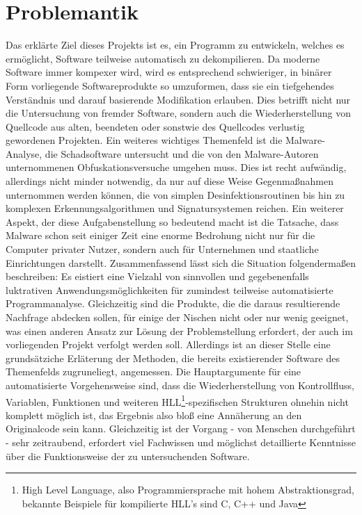 \documentclass[11pt]{article} %
\begin{document}
\section{Problemantik}
Das erklärte Ziel dieses Projekts ist es, ein Programm zu entwickeln, welches
es ermöglicht, Software teilweise automatisch zu dekompilieren. Da moderne Software immer kompexer
wird, wird es entsprechend schwieriger, in binärer Form vorliegende Softwareprodukte so umzuformen,
dass sie ein tiefgehendes Verständnis und darauf basierende Modifikation erlauben.
Dies betrifft nicht nur die Untersuchung von fremder Software, sondern auch die Wiederherstellung
von Quellcode aus alten, beendeten oder sonstwie des Quellcodes verlustig gewordenen Projekten.
Ein weiteres wichtiges Themenfeld ist die Malware-Analyse, die Schadsoftware untersucht und die von
den Malware-Autoren unternommenen Obfuskationsversuche umgehen muss. Dies ist recht aufwändig,
allerdings nicht minder notwendig, da nur auf diese Weise Gegenmaßnahmen unternommen werden können,
die von simplen Desinfektionsroutinen bis hin zu komplexen Erkennungsalgorithmen und Signatursystemen
reichen. Ein weiterer Aspekt, der diese Aufgabenstellung so bedeutend macht ist die Tatsache, dass
Malware schon seit einiger Zeit eine enorme Bedrohung nicht nur für die Computer privater Nutzer, sondern
auch für Unternehmen und staatliche Einrichtungen darstellt. Zusammenfassend lässt sich die Situation
folgendermaßen beschreiben: Es eistiert eine Vielzahl von sinnvollen und gegebenenfalls luktrativen
Anwendungsmöglichkeiten für zumindest teilweise automatisierte Programmanalyse. Gleichzeitig sind die
Produkte, die die daraus resultierende Nachfrage abdecken sollen, für einige der Nischen nicht oder nur
wenig geeignet, was einen anderen Ansatz zur Lösung der Problemstellung erfordert, der auch im vorliegenden
Projekt verfolgt werden soll. Allerdings ist an dieser Stelle eine grundsätziche Erläterung der Methoden,
die bereits existierender Software des Themenfelds zugruneliegt, angemessen.
Die Hauptargumente für eine automatisierte Vorgehensweise sind, dass die Wiederherstellung von Kontrollfluss,
Variablen, Funktionen und weiteren HLL\footnote{High Level Language, also Programmiersprache mit hohem
Abstraktionsgrad, bekannte Beispiele für kompilierte HLL's sind C, C++ und Java}-spezifischen Strukturen
ohnehin nicht komplett möglich ist, das Ergebnis also bloß eine Annäherung an den Originalcode sein kann.
Gleichzeitig ist der Vorgang - von Menschen durchgeführt - sehr zeitraubend, erfordert viel
Fachwissen und möglichst detaillierte Kenntnisse über die Funktionsweise der zu untersuchenden Software.
\end{document}
